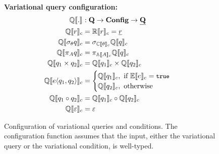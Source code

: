 \begin{figure}
\medskip
\textbf{Variational query configuration:}
\begin{alignat*}{1}
\eeSem [] . &: \qSet \to \confSet \to \pQSet\\
%
\eeSem \vRel &= \orSem \vRel = \pRel\\
\eeSem {\vSel \vQ}  &= \vSel [\ecSem \vCond] {\eeSem \vQ}\\
%
\eeSem {\vPrj [\vAttList] \vQ} &= \vPrj [\olSem \vAttList] {\eeSem \vQ}\\
%
%
\eeSem {{\vQ_1} \times {\vQ_2}} &= \eeSem {\vQ_1} \times \eeSem {\vQ_2}\\
%
%
\eeSem {\chc {\vQ_1, \vQ_2}} &= 
	\begin{cases}
		\eeSem {\vQ_1}, \text{ if } \fSem \dimMeta = \t\\
		\eeSem {\vQ_2}, \text{ otherwise}
	\end{cases}\\
%
\eeSem {{\vQ_1} \circ {\vQ_2}} &= \eeSem {\vQ_1} \circ \eeSem {\vQ_2}\\
%
\eeSem {\empRel} &= \empPRel
\end{alignat*}
\caption[Configuration of variational queries and conditions]{Configuration of variational queries and conditions. 
The configuration function assumes that the input, either the variational query or
the variational condition,
is well-typed. 
}
\label{fig:v-alg-conf-sem}
\end{figure}
